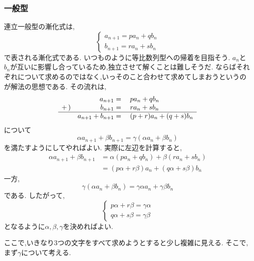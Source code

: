   \subsubsection{一般型}
    連立一般型の漸化式は,
    \[
      \begin{cases}
        a_{n+1}=pa_{n}+qb_{n} \\
        b_{n+1}=ra_{n}+sb_{n}
      \end{cases}
    \]
    で表される漸化式である.
    いつものように等比数列型への帰着を目指そう.
    $a_n$と$b_n$が互いに影響し合っているため,独立させて解くことは難しそうだ.
    ならばそれぞれについて求めるのではなく,いっそのこと合わせて求めてしまおうというのが解法の思想である.
    その流れは,
    \[
      \begin{array}{rrl}
        & a_{n+1}={} &pa_{n}+qb_{n}\\
        +\,) & b_{n+1}={} & ra_{n}+sb_{n}\\ \hline
        & a_{n+1}+b_{n+1}={} & (p+r)a_{n}+(q+s)b_{n}
      \end{array}
    \]
    について
    \[
      \alpha a_{n+1}+\beta b_{n+1}
      =\gamma(\alpha a_n+\beta b_n)
    \]
    を満たすようにしてやればよい.
    実際に左辺を計算すると,
    \begin{align*}
      \alpha a_{n+1}+\beta b_{n+1}&=\alpha(pa_n+qb_n)+\beta(ra_n+sb_n)\\
      &=(p\alpha+r\beta)a_n+(q\alpha+s\beta)b_n
    \end{align*}
    一方,
    \[
      \gamma(\alpha a_n+\beta b_n)=\gamma\alpha a_n+\gamma\beta b_n
    \]
    である.
    したがって,
    \[
    \begin{cases}
      p\alpha+r\beta=\gamma\alpha\\
      q\alpha+s\beta=\gamma\beta
    \end{cases}
    \]
    となるように$\alpha,\beta,\gamma$を決めればよい.

    ここで,いきなり3つの文字をすべて求めようとすると少し複雑に見える.
    そこで,まず$\gamma$について考える.

